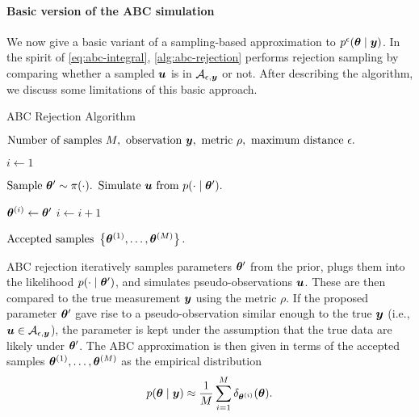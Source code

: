 \paragraph{Basic version of the ABC simulation}
We now give a basic variant of a sampling-based approximation to $p^\epsilon(\bm{\theta} \mid \bm{y})$. In the spirit of \eqref{eq:abc-integral}, \autoref{alg:abc-rejection} performs rejection sampling by comparing whether a sampled $\bm{u}$ is in $\mathcal{A}_{\epsilon, \bm{y}}$ or not. After describing the algorithm, we discuss some limitations of this basic approach.
\begin{algorithm}[ht]
    \caption{ABC Rejection Algorithm}
    \label{alg:abc-rejection}
    \begin{algorithmic}[1]
        \Input $\text{Number of samples } M, \text{ observation } \bm{y}, \text{ metric } \rho, \text{ maximum distance } \epsilon.$
        
        \State $i \gets 1$
        
        \State $\text{Sample } \bm{\theta}^\prime \sim \pi(\cdot).$ 
        \State $\text{Simulate } \bm{u} \text{ from } p(\cdot \mid \bm{\theta}^\prime).$ 
        
        \If {$\rho(\bu, \by) \leq \epsilon$}
        \State $\bm{\theta}^{(i)} \gets \bm{\theta}^\prime$ 
        \State $i \gets i + 1$
        \EndIf
        \EndWhile
        
        \Output $\text{Accepted samples } \left\{ \bm{\theta}^{(1)}, \ldots, \bm{\theta}^{(M)} \right\}.$
    \end{algorithmic}
\end{algorithm}

ABC rejection iteratively samples parameters $\bm{\theta}^\prime$ from the prior, plugs them into the likelihood $p(\cdot \mid \bm{\theta}^\prime)$, and simulates pseudo-observations $\bm{u}$. These are then compared to the true measurement $\bm{y}$ using the metric $\rho$. If the proposed parameter $\bm{\theta}^\prime$ gave rise to a pseudo-observation similar enough to the true $\bm{y}$ (i.e., $\bm{u} \in \mathcal{A}_{\epsilon, \bm{y}}$), the parameter is kept under the assumption that the true data are likely under $\bm{\theta}^\prime$. The ABC approximation is then given in terms of the accepted samples $\bm{\theta}^{(1)}, \ldots, \bm{\theta}^{(M)}$ as the empirical distribution
\begin{equation*}
p(\bm{\theta} \mid \bm{y}) \approx \frac{1}{M} \sum_{i=1}^M \delta_{\bm{\theta}^{(i)}}(\bm{\theta}).
\end{equation*}

